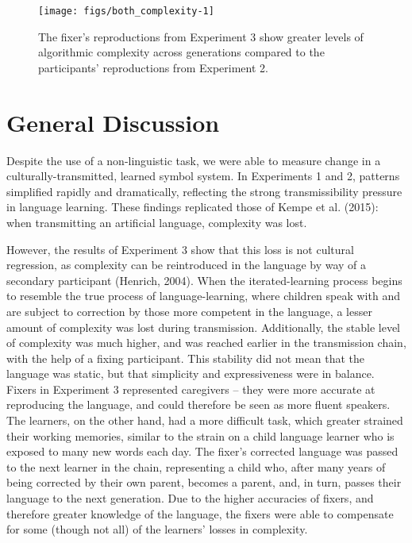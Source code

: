 \documentclass[10pt, letterpaper]{article}
\newenvironment{CodeChunk}{}{}
\begin{document}
\begin{CodeChunk}
\begin{figure}[tb]

{\centering \texttt{[image: figs/both\_complexity-1]} 

}

\caption[The fixer's reproductions from Experiment 3 show greater levels of algorithmic complexity across generations compared to the participants' reproductions from Experiment 2]{The fixer's reproductions from Experiment 3 show greater levels of algorithmic complexity across generations compared to the participants' reproductions from Experiment 2.}\label{fig:both_complexity}
\end{figure}
\end{CodeChunk}

\section{General Discussion}\label{general-discussion}

Despite the use of a non-linguistic task, we were able to measure change
in a culturally-transmitted, learned symbol system. In Experiments 1 and
2, patterns simplified rapidly and dramatically, reflecting the strong
transmissibility pressure in language learning. These findings
replicated those of Kempe et al. (2015): when transmitting an artificial
language, complexity was lost.

However, the results of Experiment 3 show that this loss is not cultural
regression, as complexity can be reintroduced in the language by way of
a secondary participant (Henrich, 2004). When the iterated-learning
process begins to resemble the true process of language-learning, where
children speak with and are subject to correction by those more
competent in the language, a lesser amount of complexity was lost during
transmission. Additionally, the stable level of complexity was much
higher, and was reached earlier in the transmission chain, with the help
of a fixing participant. This stability did not mean that the language
was static, but that simplicity and expressiveness were in balance.
Fixers in Experiment 3 represented caregivers -- they were more accurate
at reproducing the language, and could therefore be seen as more fluent
speakers. The learners, on the other hand, had a more difficult task,
which greater strained their working memories, similar to the strain on
a child language learner who is exposed to many new words each day. The
fixer's corrected language was passed to the next learner in the chain,
representing a child who, after many years of being corrected by their
own parent, becomes a parent, and, in turn, passes their language to the
next generation. Due to the higher accuracies of fixers, and therefore
greater knowledge of the language, the fixers were able to compensate
for some (though not all) of the learners' losses in complexity.
\end{document}
